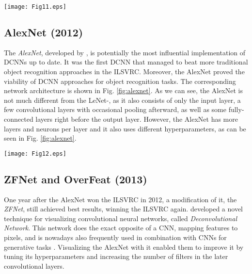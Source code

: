 \documentclass[conference]{IEEEtran}
\begin{document}
\begin{figure*}
\texttt{[image: Fig11.eps]}
\caption{The architecture of the LeNet-5. The network consists of an input layer, a convolutional layer, a pooling layer, a second convolutional layer, another pooling layer, another convolutional layer, a fully-connected layer and an output layer from left to right}
\label{fig:lenet}
\end{figure*}


\subsection{AlexNet (2012)}\label{subsec:alexnet}
The \emph{AlexNet}, developed by \cite{AlexNet}, is potentially the most influential implementation of DCNNs up to date. It was the first DCNN that managed to beat more traditional object recognition approaches in the ILSVRC. Moreover, the AlexNet proved the viability of DCNN approaches for object recognition tasks. The corresponding network architecture is shown in Fig. \ref{fig:alexnet}. As we can see, the AlexNet is not much different from the LeNet-, as it also consists of only the input layer, a few convolutional layers with occasional pooling afterward, as well as some fully-connected layers right before the output layer. However, the AlexNet has more layers and neurons per layer and it also uses different hyperparameters, as can be seen in Fig. \ref{fig:alexnet}.

\begin{figure*}
\texttt{[image: Fig12.eps]}
\caption{The AlexNet, containing five convolutional , three pooling and two fully-connected layers between input and output layers}
\label{fig:alexnet}
\end{figure*}


\subsection{ZFNet and OverFeat (2013)}\label{subsec:zfnet}
One year after the AlexNet won the ILSVRC in 2012, a modification of it, the \emph{ZFNet}, still achieved best results, winning the ILSVRC again. \cite{ZFNet} developed a novel technique for visualizing convolutional neural networks, called \emph{Deconvolutional Network}. This network does the exact opposite of a CNN, mapping features to pixels, and is nowadays also frequently used in combination with CNNs for generative tasks \cite{GAN}. Visualizing the AlexNet with it enabled them to improve it by tuning its hyperparameters and increasing the number of filters in the later convolutional layers.
\end{document}
